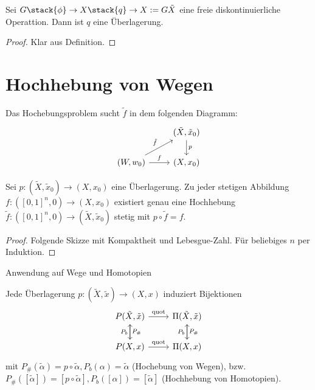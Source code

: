 \begin{st}
	Sei $G \stack{\phi}\to X \stack{q}\to X := G \\ \tilde X$ eine freie diskontinuierliche Operattion.
	Dann ist $q$ eine Überlagerung.
	\begin{proof}
		Klar aus Definition.
	\end{proof}
\end{st}


\section{Hochhebung von Wegen}


Das Hochebungsproblem sucht $\tilde f$ in dem folgenden Diagramm:
\[
	\begin{tikzcd}~
		& (\tilde X, \tilde x_0) \arrow{d}{p} \\
		(W, w_0) \arrow{ur}{\tilde f} \arrow{r}{f} & (X, x_0)
	\end{tikzcd}
\]

\begin{st}
	Sei $p: (\tilde X, \tilde x_0) \to (X, x_0)$ eine Überlagerung.
	Zu jeder stetigen Abbildung $f: ([0,1]^n, 0) \to (X, x_0)$ existiert genau eine Hochhebung $\tilde f: ([0,1]^n, 0) \to (\tilde X, \tilde x_0)$ stetig mit $p \circ \tilde f = f$.
	\begin{proof}
		Folgende Skizze mit Kompaktheit und Lebesgue-Zahl.
		Für beliebiges $n$ per Induktion.
	\end{proof}
\end{st}

Anwendung auf Wege und Homotopien

\begin{st}
	Jede Überlagerung $p: (\tilde X, \tilde x) \to (X, x)$ induziert Bijektionen
	\[
		\begin{tikzcd}
			P(\tilde X, \tilde x) \arrow{d}{P_\#} \arrow{r}{\quot} & \Pi(\tilde X,\tilde x) \arrow{d}{P_\#} \\
			P(X, x) \arrow{u}{P_b} \arrow{r}{\quot} & \Pi(X, x) \arrow{u}{P_b}
		\end{tikzcd}
	\]
	mit $P_\#(\tilde \alpha) = p \circ \tilde \alpha, P_b(\alpha) = \tilde \alpha$ (Hochebung von Wegen), bzw. $P_\#([\tilde \alpha]) = [p\circ \tilde \alpha], P_b([\alpha]) = [\tilde \alpha]$ (Hochhebung von Homotopien).
\end{st}

